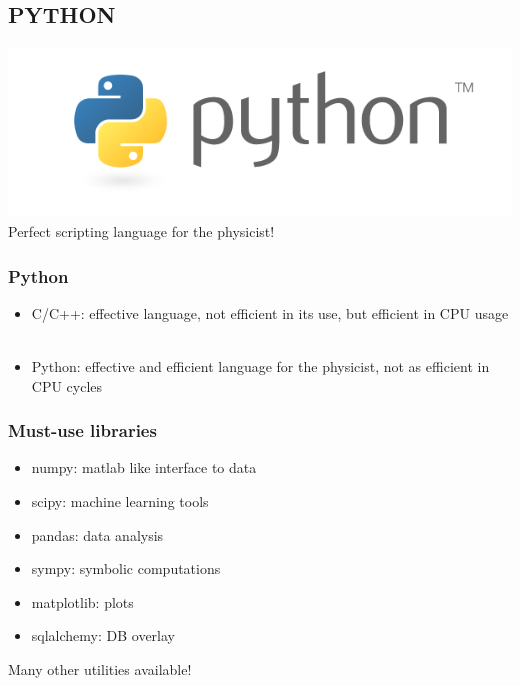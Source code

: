 \documentclass[14pt,notes]{beamer}
\begin{document}
\subsection{PYTHON}
\begin{frame}
\includegraphics[width=\textwidth]{python-logo-master-v3-TM}\\
Perfect scripting language for the physicist!
\end{frame}

\begin{frame}
\frametitle{Python}
\begin{itemize}
\item C/C++: effective language, not efficient in its use, but efficient in CPU usage\\~
\item Python: effective and efficient language for the physicist, not as efficient in CPU cycles
\end{itemize}
\end{frame}

\begin{frame}
\frametitle{Must-use libraries}
\begin{itemize}
\item numpy: matlab like interface to data
\item scipy: machine learning tools
\item pandas: data analysis
\item sympy: symbolic computations
\item matplotlib: plots
\item sqlalchemy: DB overlay
\end{itemize}
Many other utilities available!
\end{frame}
\end{document}
